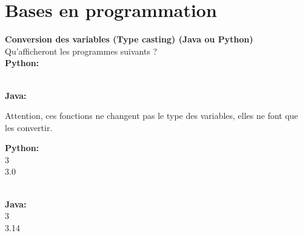\section{Bases en programmation}


\begin{Exercice}[5 minutes] \textbf{Conversion des variables (Type casting) (Java ou Python)}\\
   Qu'afficheront les programmes suivants ? \\
   
   \textbf{Python:}
   
   
   \textbf{\\Java:}
   
    
   
    \begin{conseil}
      	Attention, ces fonctions ne changent pas le type des variables, elles ne font que les convertir.
        
    \end{conseil}
    \begin{solution}
     
    \textbf{Python:}\\
    3\\
    3.0
    
    \textbf{\\Java:}\\
    3\\
    3.14 \\
           
    \end{solution}   
\end{Exercice}



